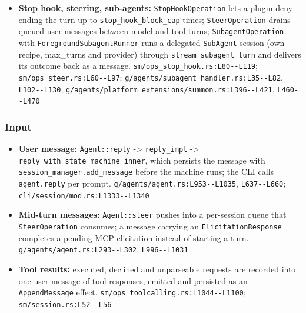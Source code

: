 \begin{itemize}
\item \textbf{Stop hook, steering, sub-agents:} \texttt{StopHookOperation} lets a plugin deny ending the turn up to \texttt{stop\_\allowbreak{}hook\_\allowbreak{}block\_\allowbreak{}cap} times; \texttt{SteerOperation} drains queued user messages between model and tool turns; \texttt{SubagentOperation} with \texttt{ForegroundSubagentRunner} runs a delegated \texttt{SubAgent} session (own recipe, max\_turns and provider) through \texttt{stream\_\allowbreak{}subagent\_\allowbreak{}turn} and delivers its outcome back as a message. \texttt{sm/\allowbreak{}ops\_\allowbreak{}stop\_\allowbreak{}hook.\allowbreak{}rs:\allowbreak{}L80-\allowbreak{}-\allowbreak{}L119}; \texttt{sm/\allowbreak{}ops\_\allowbreak{}steer.\allowbreak{}rs:\allowbreak{}L60-\allowbreak{}-\allowbreak{}L97}; \texttt{g/\allowbreak{}agents/\allowbreak{}subagent\_\allowbreak{}handler.\allowbreak{}rs:\allowbreak{}L35-\allowbreak{}-\allowbreak{}L82}, \texttt{L102-\allowbreak{}-\allowbreak{}L130}; \texttt{g/\allowbreak{}agents/\allowbreak{}platform\_\allowbreak{}extensions/\allowbreak{}summon.\allowbreak{}rs:\allowbreak{}L396-\allowbreak{}-\allowbreak{}L421}, \texttt{L460-\allowbreak{}-\allowbreak{}L470}
\end{itemize}

\subsubsection*{Input}
\begin{itemize}
\item \textbf{User message:} \texttt{Agent:\allowbreak{}:\allowbreak{}reply} -> \texttt{reply\_\allowbreak{}impl} -> \texttt{reply\_\allowbreak{}with\_\allowbreak{}state\_\allowbreak{}machine\_\allowbreak{}inner}, which persists the message with \texttt{session\_\allowbreak{}manager.\allowbreak{}add\_\allowbreak{}message} before the machine runs; the CLI calls \texttt{agent.\allowbreak{}reply} per prompt. \texttt{g/\allowbreak{}agents/\allowbreak{}agent.\allowbreak{}rs:\allowbreak{}L953-\allowbreak{}-\allowbreak{}L1035}, \texttt{L637-\allowbreak{}-\allowbreak{}L660}; \texttt{cli/\allowbreak{}session/\allowbreak{}mod.\allowbreak{}rs:\allowbreak{}L1333-\allowbreak{}-\allowbreak{}L1340}
\item \textbf{Mid-turn messages:} \texttt{Agent:\allowbreak{}:\allowbreak{}steer} pushes into a per-session queue that \texttt{SteerOperation} consumes; a message carrying an \texttt{ElicitationResponse} completes a pending MCP elicitation instead of starting a turn. \texttt{g/\allowbreak{}agents/\allowbreak{}agent.\allowbreak{}rs:\allowbreak{}L293-\allowbreak{}-\allowbreak{}L302}, \texttt{L996-\allowbreak{}-\allowbreak{}L1031}
\item \textbf{Tool results:} executed, declined and unparseable requests are recorded into one user message of tool responses, emitted and persisted as an \texttt{AppendMessage} effect. \texttt{sm/\allowbreak{}ops\_\allowbreak{}toolcalling.\allowbreak{}rs:\allowbreak{}L1044-\allowbreak{}-\allowbreak{}L1100}; \texttt{sm/\allowbreak{}session.\allowbreak{}rs:\allowbreak{}L52-\allowbreak{}-\allowbreak{}L56}
\end{itemize}

